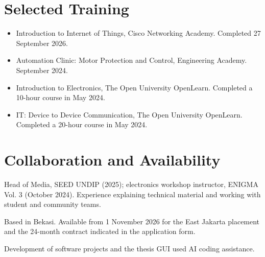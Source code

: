 \documentclass[11pt,a4paper]{article}
\begin{document}
\section{Selected Training}
\begin{itemize}
\item Introduction to Internet of Things, Cisco Networking Academy. Completed 27 September 2026.
\item Automation Clinic: Motor Protection and Control, Engineering Academy. September 2024.
\item Introduction to Electronics, The Open University OpenLearn. Completed a 10-hour course in May 2024.
\item IT: Device to Device Communication, The Open University OpenLearn. Completed a 20-hour course in May 2024.
\end{itemize}
\section{Collaboration and Availability}
Head of Media, SEED UNDIP (2025); electronics workshop instructor, ENIGMA Vol. 3 (October 2024). Experience explaining technical material and working with student and community teams.\par
Based in Bekasi. Available from 1 November 2026 for the East Jakarta placement and the 24-month contract indicated in the application form.\par
{\small Development of software projects and the thesis GUI used AI coding assistance.}
\end{document}
